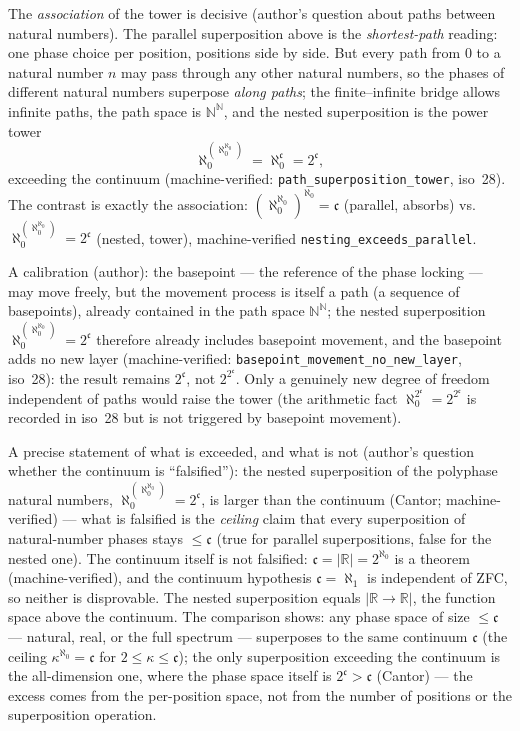 \documentclass{article}
\begin{document}
The \emph{association} of the tower is decisive (author's question about
paths between natural numbers). The parallel superposition above is the
\emph{shortest-path} reading: one phase choice per position, positions
side by side. But every path from $0$ to a natural number $n$ may pass
through any other natural numbers, so the phases of different natural
numbers superpose \emph{along paths}; the finite--infinite bridge allows
infinite paths, the path space is $\mathbb N^{\mathbb N}$, and the
nested superposition is the power tower
\[
\aleph_0^{(\aleph_0^{\aleph_0})}
=\aleph_0^{\mathfrak c}
=2^{\mathfrak c},
\]
exceeding the continuum (machine-verified:
\texttt{path\_superposition\_tower}, iso~28). The contrast is exactly
the association:
$(\aleph_0^{\aleph_0})^{\aleph_0}=\mathfrak c$ (parallel, absorbs) vs.
$\aleph_0^{(\aleph_0^{\aleph_0})}=2^{\mathfrak c}$ (nested, tower),
machine-verified \texttt{nesting\_exceeds\_parallel}.

A calibration (author): the basepoint --- the reference of the phase
locking --- may move freely, but the movement process is itself a path
(a sequence of basepoints), already contained in the path space
$\mathbb N^{\mathbb N}$; the nested superposition
$\aleph_0^{(\aleph_0^{\aleph_0})}=2^{\mathfrak c}$ therefore already
includes basepoint movement, and the basepoint adds no new layer
(machine-verified: \texttt{basepoint\_movement\_no\_new\_layer}, iso~28):
the result remains $2^{\mathfrak c}$, not $2^{2^{\mathfrak c}}$. Only a
genuinely new degree of freedom independent of paths would raise the
tower (the arithmetic fact
$\aleph_0^{2^{\mathfrak c}}=2^{2^{\mathfrak c}}$ is recorded in iso~28
but is not triggered by basepoint movement).

A precise statement of what is exceeded, and what is not (author's
question whether the continuum is ``falsified''): the nested
superposition of the polyphase natural numbers,
$\aleph_0^{(\aleph_0^{\aleph_0})}=2^{\mathfrak c}$, is larger than the
continuum (Cantor; machine-verified) --- what is falsified is the
\emph{ceiling} claim that every superposition of natural-number phases
stays $\le\mathfrak c$ (true for parallel superpositions, false for the
nested one). The continuum itself is not falsified: $\mathfrak c=|\mathbb
R|=2^{\aleph_0}$ is a theorem (machine-verified), and the continuum
hypothesis $\mathfrak c=\aleph_1$ is independent of ZFC, so neither is
disprovable. The nested superposition equals $|\mathbb R\to\mathbb R|$,
the function space above the continuum. The comparison
shows: any
phase space of size $\le\mathfrak c$ --- natural, real, or the full
spectrum --- superposes to the same continuum $\mathfrak c$ (the ceiling
$\kappa^{\aleph_0}=\mathfrak c$ for $2\le\kappa\le\mathfrak c$); the
only superposition exceeding the continuum is the all-dimension one,
where the phase space itself is $2^{\mathfrak c}>\mathfrak c$ (Cantor)
--- the excess comes from the per-position space, not from the number of
positions or the superposition operation.
\end{document}

